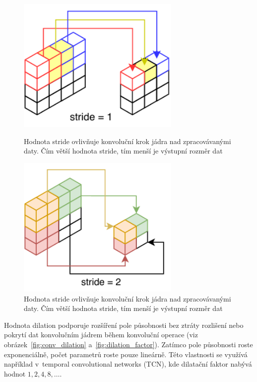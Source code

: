 \begin{figure}[H]
    \centering
    \begin{minipage}{0.45\textwidth}
        \centering
        \includegraphics[width=0.7\textwidth]{obrazky-figures/stride1.pdf}
        \caption{\label{fig:conv_stride1}Hodnota stride ovlivňuje konvoluční krok jádra nad zpracovávanými daty. Čím větší hodnota stride, tím menší je výstupní rozměr dat}
    \end{minipage}\hfill
    \begin{minipage}{0.45\textwidth}
        \centering
        \includegraphics[width=0.7\textwidth]{obrazky-figures/stride2.pdf}
        \caption{\label{fig:conv_stride2}Hodnota stride ovlivňuje konvoluční krok jádra nad zpracovávanými daty. Čím větší hodnota stride, tím menší je výstupní rozměr dat}
    \end{minipage}
\end{figure}


Hodnota dilation podporuje rozšíření pole působnosti bez ztráty rozlišení nebo pokrytí dat konvolučním jádrem během konvoluční operace (viz obrázek~\ref{fig:conv_dilation} a~\ref{fig:dilation_factor}). Zatímco pole působnosti roste exponenciálně, počet parametrů roste pouze lineárně. Této vlastnosti se využívá například v~temporal convolutional networks (TCN), kde dilatační faktor nabývá hodnot $1, 2, 4, 8, \dots$.

